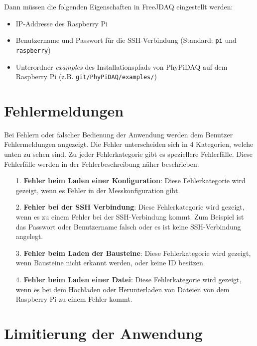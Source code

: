 \documentclass[parskip=full]{scrartcl}
\begin{document}
Dann müssen die folgenden Eigenschaften in FreeJDAQ eingestellt werden:

\begin{itemize}

\item IP-Addresse des Raspberry Pi
\item Benutzername und Passwort für die SSH-Verbindung (Standard: \verb:pi: und \verb:raspberry:)
\item Unterordner \textit{examples} des Installationspfads von PhyPiDAQ auf dem Raspberry Pi (z.B. \verb:git/PhyPiDAQ/examples/:)

\end{itemize}

\section{Fehlermeldungen}

Bei Fehlern oder falscher Bedienung der Anwendung werden dem Benutzer Fehlermeldungen angezeigt. Die Fehler unterscheiden sich in 4 Kategorien, welche unten zu sehen sind. Zu jeder Fehlerkategorie gibt es speziellere Fehlerfälle. Diese Fehlerfälle werden in der Fehlerbeschreibung näher beschrieben.

\begin{itemize}


\item[1.] \textbf{Fehler beim Laden einer Konfiguration}: Diese Fehlerkategorie wird gezeigt, wenn es Fehler in der Messkonfiguration gibt.

\item[2.] \textbf{Fehler bei der SSH Verbindung}: Diese Fehlerkategorie wird gezeigt, wenn es zu einem Fehler bei der SSH-Verbindung kommt. Zum Beispiel ist das Passwort oder Benutzername falsch oder es ist keine SSH-Verbindung angelegt.

\item[3.] \textbf{Fehler beim Laden der Bausteine}: Diese Fehlerkategorie wird gezeigt, wenn Bausteine nicht erkannt werden, oder keine ID besitzen.

\item[4.] \textbf{Fehler beim Laden einer Datei}: Diese Fehlerkategorie wird gezeigt, wenn es bei dem Hochladen oder Herunterladen von Dateien von dem Raspberry Pi zu einem Fehler kommt.

\end{itemize}

\section{Limitierung der Anwendung}


\printnoidxglossaries				%
\end{document}
